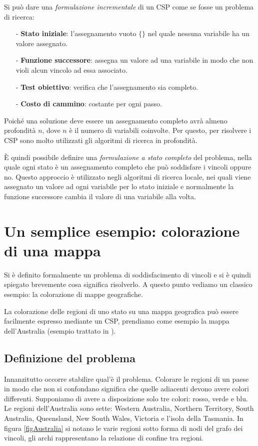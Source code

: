Si può dare una \emph{formulazione incrementale} di un CSP come se fosse un
problema di ricerca:
\begin{itemize}
\item[-]\textbf{Stato iniziale}: l'assegnamento vuoto $\{\}$ nel quale
nessuna variabile ha un valore assegnato.
\item[-]\textbf{Funzione successore}: assegna un valore ad una variabile
in modo  che
non violi alcun vincolo ad essa associato.
\item[-]\textbf{Test obiettivo}: verifica che l'assegnamento sia completo.
\item[-]\textbf{Costo di cammino}: costante per ogni passo.
\end{itemize}

Poiché una soluzione deve essere un assegnamento completo avrà almeno profondità
$n$, dove $n$ è il numero di variabili coinvolte. Per questo, per risolvere i
CSP sono molto utilizzati gli algoritmi di ricerca in profondità.

\`E quindi possibile definire una \emph{formulazione a stato completo} del
problema, nella quale ogni stato è un assegnamento completo che può soddisfare
i vincoli oppure no. Questo approccio è utilizzato negli algoritmi di ricerca
locale, nei quali viene assegnato un valore ad ogni variabile per lo stato
iniziale e normalmente la funzione successore cambia il valore di una variabile
alla volta.

\section{Un semplice esempio: colorazione di una mappa}
Si è definito formalmente un problema di soddisfacimento di vincoli e si è
quindi spiegato brevemente cosa significa risolverlo. A questo punto vediamo un
classico esempio: la colorazione di mappe geografiche.

La colorazione delle regioni di uno stato su una mappa geografica può essere
facilmente espresso mediante un CSP, prendiamo come esempio la mappa
dell'Australia (esempio trattato in \cite{intArt}).

\subsection{Definizione del problema}
Innanzitutto occorre stabilire qual'è il problema. Colorare le regioni di un
paese in modo che non si confondano significa che quelle adiacenti devono
avere colori differenti. Supponiamo di avere a disposizione solo tre colori:
rosso, verde e blu. Le regioni dell'Australia sono sette: Western Australia,
Northern Territory, South Australia, Queensland, New South Wales, Victoria
e l'isola della Tasmania. In figura \ref{figAustralia} si notano le varie
regioni sotto forma di nodi del grafo dei vincoli, gli archi rappresentano la
relazione di
confine tra regioni.


